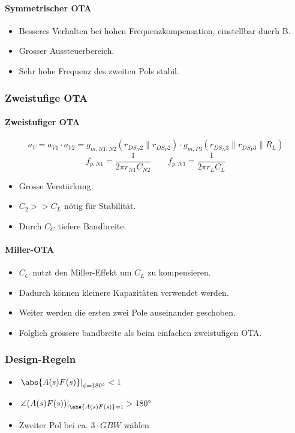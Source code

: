 \paragraph{Symmetrischer OTA}
\begin{itemize}
    \item Besseres Verhalten bei hohen Frequenzkompensation, einstellbar ducrh B.
    \item Grosser Aussteuerbereich.
    \item Sehr hohe Frequenz des zweiten Pols \textrightarrow{} stabil.
\end{itemize}

\subsubsection{Zweistufige OTA}
\paragraph{Zweistufiger OTA}
\[
    a_V = a_{V1} \cdot a_{V2} = g_{m, N1, N2} (r_{DS_N2} \parallel r_{DS_P2}) \cdot g_{m, P3} (r_{DS_N3} \parallel r_{DS_P3} \parallel R_L)
\]
\[
    f_{p,N1} = \frac{1}{2\pi r_{N1} C_{N2}} \qquad f_{p,N3} = \frac{1}{2\pi r_{L} C_{L}}
\]

\begin{itemize}
    \item Grosse Verstärkung.
    \item $C_2 >> C_L$ nötig für Stabilität.
    \item Durch $C_C$ tiefere Bandbreite.
\end{itemize}

\paragraph{Miller-OTA}

\begin{itemize}
    \item $C_C$ nutzt den Miller-Effekt um $C_L$ zu kompensieren.
    \item Dadurch können kleinere Kapazitäten verwendet werden.
    \item Weiter werden die ersten zwei Pole auseinander geschoben. 
    \item Folglich grössere bandbreite als beim einfachen zweistufigen OTA.
\end{itemize} %


\subsubsection{Design-Regeln}
\begin{itemize}
    \item $\left. \abs{A(s)F(s)} \right|_{\phi = 180^\circ} < 1$
    \item $\left. \angle (A(s)F(s)) \right|_{\abs{A(s)F(s)} = 1} > 180^\circ$
    \item Zweiter Pol bei ca. $3 \cdot GBW$ wählen
\end{itemize}